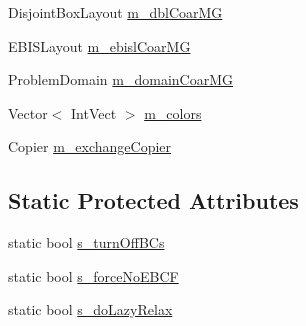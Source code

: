 \begin{DoxyCompactItemize}
\item 
Disjoint\+Box\+Layout \hyperlink{classnwoebconductivityop_a04ba4328dc72d0784f8ffaaa62a6aaf3}{m\+\_\+dbl\+Coar\+MG}
\item 
E\+B\+I\+S\+Layout \hyperlink{classnwoebconductivityop_ab756c386aec95cd4c15626acb24c66c6}{m\+\_\+ebisl\+Coar\+MG}
\item 
Problem\+Domain \hyperlink{classnwoebconductivityop_af2669ce6311ac2d2d2a6ad732b9175d2}{m\+\_\+domain\+Coar\+MG}
\item 
Vector$<$ Int\+Vect $>$ \hyperlink{classnwoebconductivityop_a457b049944b6be8ddcf860088639ac6c}{m\+\_\+colors}
\item 
Copier \hyperlink{classnwoebconductivityop_a827fe5b2f7aa82b1257bed71fd66b1c1}{m\+\_\+exchange\+Copier}
\end{DoxyCompactItemize}
\subsection*{Static Protected Attributes}
\begin{DoxyCompactItemize}
\item 
static bool \hyperlink{classnwoebconductivityop_ae0c7df8e6f421b06893cfe635230e48b}{s\+\_\+turn\+Off\+B\+Cs}
\item 
static bool \hyperlink{classnwoebconductivityop_a4e85f8399f0726e1d48d5fce1db2db42}{s\+\_\+force\+No\+E\+B\+CF}
\item 
static bool \hyperlink{classnwoebconductivityop_a92c13ea46eea68b7fa44b10a28f6ec50}{s\+\_\+do\+Lazy\+Relax}
\end{DoxyCompactItemize}
